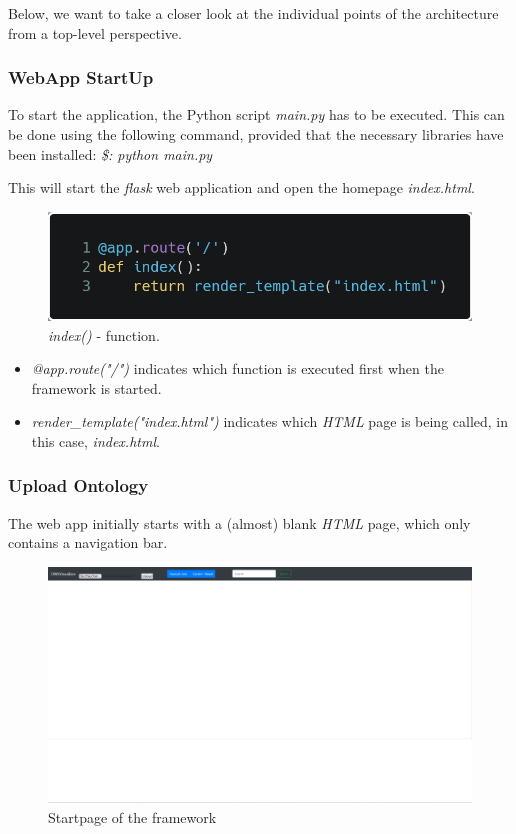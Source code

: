 Below, we want to take a closer look at the individual points of the architecture from a top-level perspective.

\subsubsection{WebApp StartUp} 

To start the application, the Python script \textit{main.py} has to be executed. This can be done using the following command, provided that the necessary libraries have been installed:
\textit{\$: python main.py}

This will start the \textit{flask} web application and open the homepage \textit{index.html}.
\begin{figure}[!ht]
    \includegraphics[scale=0.35]{Graphics/def_index.png}
    \caption{\textit{index()} - function.}
\end{figure}

\begin{itemize}
        \item \textit{@app.route("/")} indicates which function is executed first when the framework is started.
        \item \textit{render\_template("index.html")} indicates which \textit{HTML} page is being called, in this case, \textit{index.html}.
\end{itemize}

\subsubsection{Upload Ontology}

The web app initially starts with a (almost) blank \textit{HTML} page, which only contains a navigation bar. 
\begin{figure}[H]
    \includegraphics[scale=0.3]{Graphics/webapp_startupt_html.png}
    \caption{Startpage of the framework}
\end{figure}


